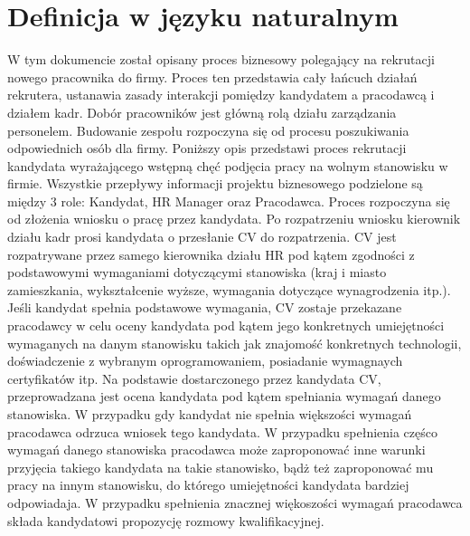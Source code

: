 \documentclass[a4paper, 12pt]{article}
\begin{document}
\section{Definicja w języku naturalnym}
	\hspace*{1cm} W tym dokumencie został opisany proces biznesowy polegający na rekrutacji nowego pracownika do firmy. Proces ten  przedstawia cały łańcuch działań rekrutera, ustanawia zasady interakcji pomiędzy kandydatem a pracodawcą i działem kadr.\newline
	\hspace*{1cm} Dobór pracowników jest główną rolą działu zarządzania personelem. Budowanie zespołu rozpoczyna się od procesu poszukiwania odpowiednich osób dla firmy. Poniższy opis przedstawi proces rekrutacji kandydata wyrażającego wstępną chęć podjęcia pracy na wolnym stanowisku w firmie.\newline
	\hspace*{1cm} Wszystkie przepływy informacji projektu biznesowego podzielone są między 3 role: Kandydat, HR Manager oraz Pracodawca.\newline
	\hspace*{1cm}  Proces rozpoczyna się od złożenia wniosku o pracę przez kandydata. Po rozpatrzeniu wniosku kierownik działu kadr prosi kandydata o przesłanie CV do rozpatrzenia. CV jest rozpatrywane przez samego kierownika działu HR pod kątem zgodności z podstawowymi wymaganiami dotyczącymi stanowiska (kraj i miasto zamieszkania, wykształcenie wyższe, wymagania dotyczące wynagrodzenia itp.). Jeśli kandydat spełnia podstawowe wymagania, CV zostaje przekazane pracodawcy w celu oceny kandydata pod kątem jego konkretnych umiejętności wymaganych na danym stanowisku takich jak znajomość konkretnych technologii, doświadczenie z wybranym oprogramowaniem, posiadanie wymagnaych certyfikatów itp. Na podstawie dostarczonego przez kandydata CV, przeprowadzana jest ocena kandydata pod kątem spełniania wymagań danego stanowiska.\newline
	\hspace*{1 cm} W przypadku gdy kandydat nie spełnia większości wymagań pracodawca odrzuca wniosek tego kandydata. W przypadku spełnienia częśco wymagań danego stanowiska pracodawca może zaproponować inne warunki przyjęcia takiego kandydata na takie stanowisko, bądż też zaproponować mu pracy na innym stanowisku, do którego umiejętności kandydata bardziej odpowiadaja. W przypadku spełnienia znacznej więkoszości wymagań pracodawca składa kandydatowi propozycję rozmowy kwalifikacyjnej.\newline
\end{document}
